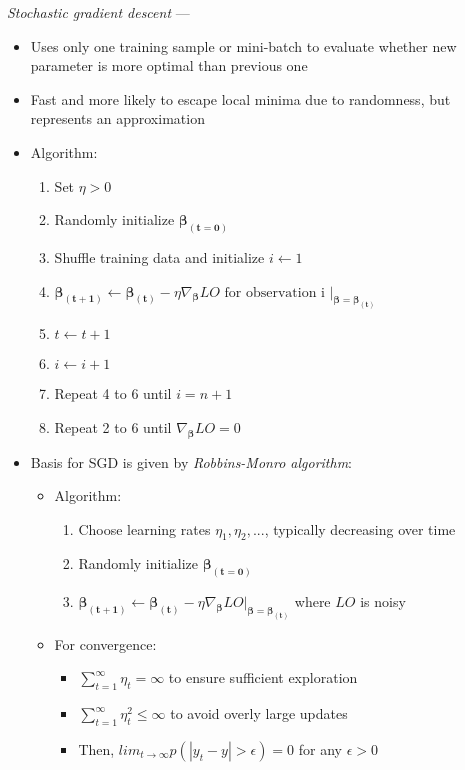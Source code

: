 \emph{Stochastic gradient descent} ---
\begin{itemize}
    \item Uses only one training sample or mini-batch to evaluate whether new parameter is more optimal than previous one
    \item Fast and more likely to escape local minima due to randomness, but represents an approximation  
    \item Algorithm: 
    \begin{enumerate}
        \item Set $\eta > 0$
        \item Randomly initialize $\boldsymbol{\beta_{(t=0)}}$
        \item Shuffle training data and initialize $i \leftarrow 1$
        \item $\boldsymbol{\beta_{(t+1)}} \leftarrow \boldsymbol{\beta_{(t)}} - \eta \nabla_{\boldsymbol{\beta}} LO \textrm{ for observation i } |_{\boldsymbol{\beta} = \boldsymbol{\beta_{(t)}}}$
        \item $t \leftarrow t+1$
        \item $i \leftarrow i+1$
        \item Repeat 4 to 6 until $i = n+1$
        \item Repeat 2 to 6 until $\nabla_{\boldsymbol{\beta}} LO = 0$
    \end{enumerate}
    \item Basis for SGD is given by \emph{Robbins-Monro algorithm}:
    \begin{itemize}
        \item Algorithm:
        \begin{enumerate}
            \item Choose learning rates $\eta_1, \eta_2, ...$, typically decreasing over time
            \item Randomly initialize $\boldsymbol{\beta_{(t=0)}}$
            \item $\boldsymbol{\beta_{(t+1)}} \leftarrow \boldsymbol{\beta_{(t)}} - \eta \nabla_{\boldsymbol{\beta}} LO|_{\boldsymbol{\beta} = \boldsymbol{\beta_{(t)}}}$ where $LO$ is noisy
        \end{enumerate}
        \item For convergence:
        \begin{itemize}
            \item $\sum_{t=1}^\infty \eta_t = \infty$ to ensure sufficient exploration
            \item $\sum_{t=1}^\infty \eta_t^2 \leq \infty$ to avoid overly large updates
            \item Then, $lim_{t \rightarrow \infty} p( | y_t - y | > \epsilon ) = 0$ for any $\epsilon > 0$
        \end{itemize}
    \end{itemize}
\end{itemize}

